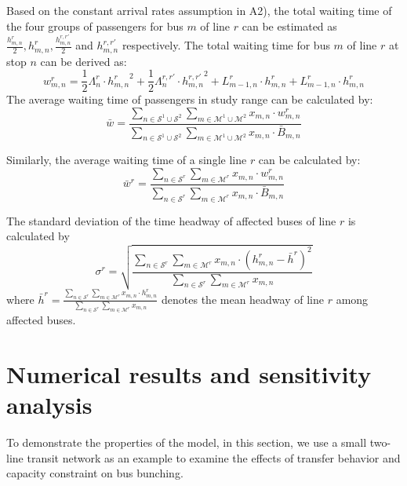 \documentclass[smallextended]{svjour3}       %
\begin{document}
\begin{Abstract}
Based on the constant arrival rates assumption in A2), 
the total waiting time of the four groups of passengers for bus $m$ of line $r$ can be estimated 
as $\frac{h_{m,n}^{r}}{2},h_{m,n}^{r},\frac{h_{m,n}^{r,r'}}{2}$ and $h_{m,n}^{r,r'}$ respectively. 
The total waiting time for bus $m$ of line $r$ at stop $n$ can be derived as: 
\begin{equation}
    w_{m,n}^{r} = \frac{1}{2}\Lambda_{n}^{r}\cdot {h_{m,n}^{r}}^{2} + \frac{1}{2}\Lambda_{n}^{r,r'}\cdot {h_{m,n}^{r,r'}}^{2}
    + L_{m-1,n}^{r} \cdot h_{m,n}^{r} + L_{m-1,n}^{r} \cdot h_{m,n}^{r}
\end{equation}
The average waiting time of passengers in study range can be calculated by: 
\begin{equation}
    \bar{w} = \frac{\sum\limits_{n\in \mathcal{S}^{1}\cup\mathcal{S}^{2}}\sum\limits_{m\in \mathcal{M}^{1}\cup\mathcal{M}^{2}} x_{m,n}\cdot w_{m,n}^{r}}
    {\sum\limits_{n\in \mathcal{S}^{1}\cup \mathcal{S}^{2}} \sum\limits_{m\in \mathcal{M}^{1}\cup \mathcal{M}^{2}}x_{m,n}\cdot \bar{B}_{m,n}}
\end{equation}

Similarly, the average waiting time of a single line $r$ can be calculated by:
\begin{equation}
    \bar{w}^{r} = \frac{\sum\limits_{n\in \mathcal{S}^{r}}\sum\limits_{m\in \mathcal{M}^{r}} x_{m,n}\cdot w_{m,n}^{r}}
    {\sum\limits_{n\in \mathcal{S}^{r}} \sum\limits_{m\in \mathcal{M}^{r}}x_{m,n}\cdot \bar{B}_{m,n}}
\end{equation}

The standard deviation of the time headway of affected buses of line $r$ is calculated by 
\begin{equation}
    \sigma^{r} = \sqrt{\frac{\sum\limits_{n\in \mathcal{S}^{r}}\sum\limits_{m\in \mathcal{M}^{r}} x_{m,n}\cdot \left(h_{m,n}^{r}-\bar{h}^{r}\right)^{2}}
    {\sum\limits_{n\in \mathcal{S}^{r}}\sum\limits_{m\in \mathcal{M}^{r}} x_{m,n}}}
\end{equation}
where $\bar{h}^{r}=\frac{\sum\limits_{n\in \mathcal{S}^{r}}\sum\limits_{m\in \mathcal{M}^{r}} x_{m,n}\cdot h_{m,n}^{r}}
{\sum\limits_{n\in \mathcal{S}^{r}}\sum\limits_{m\in \mathcal{M}^{r}} x_{m,n}}$ 
denotes the mean headway of line $r$ among affected buses.

\section{Numerical results and sensitivity analysis}\label{example}
To demonstrate the properties of the model, in this section, we use a small two-line transit network as an example to examine the effects of transfer behavior and capacity constraint on bus bunching. 


\end{Abstract}
\end{document}
